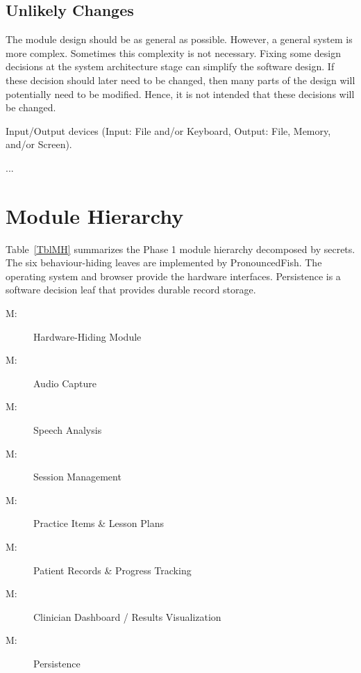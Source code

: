 \documentclass[12pt, titlepage]{article}
\newcounter{ucnum}
\newcommand{\uctheucnum}{UC\theucnum}
\newcounter{mnum}
\newcommand{\mthemnum}{M\themnum}
\begin{document}
\subsection{Unlikely Changes} \label{SecUchange}

The module design should be as general as possible. However, a general system is
more complex. Sometimes this complexity is not necessary. Fixing some design
decisions at the system architecture stage can simplify the software design. If
these decision should later need to be changed, then many parts of the design
will potentially need to be modified. Hence, it is not intended that these
decisions will be changed.

\begin{description}
\item[ \uctheucnum \label{ucIO}:] Input/Output devices
  (Input: File and/or Keyboard, Output: File, Memory, and/or Screen).
\item ...
\end{description}

\section{Module Hierarchy} \label{SecMH}

Table~\ref{TblMH} summarizes the Phase 1 module hierarchy decomposed by
secrets. The six behaviour-hiding leaves are implemented by PronouncedFish.
The operating system and browser provide the hardware interfaces.
Persistence is a software decision leaf that provides durable record storage.

\begin{description}
\item [ \mthemnum \label{mHH}:] Hardware-Hiding Module
\item [ \mthemnum \label{mAudioCapture}:] Audio Capture
\item [ \mthemnum \label{mSpeechAnalysis}:] Speech Analysis
\item [ \mthemnum \label{mSessionManagement}:] Session Management
\item [ \mthemnum \label{mPracticeItems}:] Practice Items \& Lesson Plans
\item [ \mthemnum \label{mPatientRecords}:] Patient Records \& Progress Tracking
\item [ \mthemnum \label{mClinicianDashboard}:] Clinician Dashboard / Results Visualization
\item [ \mthemnum \label{mPersistence}:] Persistence
\end{description}
\end{document}
